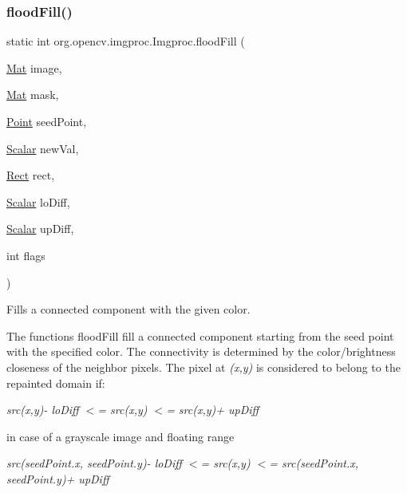 \subsubsection{\texorpdfstring{flood\+Fill()}{floodFill()}\hspace{0.1cm}{\footnotesize\ttfamily [1/2]}}
{\footnotesize\ttfamily static int org.\+opencv.\+imgproc.\+Imgproc.\+flood\+Fill (\begin{DoxyParamCaption}\item[{\mbox{\hyperlink{classorg_1_1opencv_1_1core_1_1_mat}{Mat}}}]{image,  }\item[{\mbox{\hyperlink{classorg_1_1opencv_1_1core_1_1_mat}{Mat}}}]{mask,  }\item[{\mbox{\hyperlink{classorg_1_1opencv_1_1core_1_1_point}{Point}}}]{seed\+Point,  }\item[{\mbox{\hyperlink{classorg_1_1opencv_1_1core_1_1_scalar}{Scalar}}}]{new\+Val,  }\item[{\mbox{\hyperlink{classorg_1_1opencv_1_1core_1_1_rect}{Rect}}}]{rect,  }\item[{\mbox{\hyperlink{classorg_1_1opencv_1_1core_1_1_scalar}{Scalar}}}]{lo\+Diff,  }\item[{\mbox{\hyperlink{classorg_1_1opencv_1_1core_1_1_scalar}{Scalar}}}]{up\+Diff,  }\item[{int}]{flags }\end{DoxyParamCaption})\hspace{0.3cm}{\ttfamily [static]}}

Fills a connected component with the given color.

The functions {\ttfamily flood\+Fill} fill a connected component starting from the seed point with the specified color. The connectivity is determined by the color/brightness closeness of the neighbor pixels. The pixel at {\itshape (x,y)} is considered to belong to the repainted domain if\+:


\begin{DoxyItemize}
\item {\itshape src(x\textquotesingle{},y\textquotesingle{})-\/ lo\+Diff $<$= src(x,y) $<$= src(x\textquotesingle{},y\textquotesingle{})+ up\+Diff} 
\end{DoxyItemize}

in case of a grayscale image and floating range


\begin{DoxyItemize}
\item {\itshape src(seed\+Point.\+x, seed\+Point.\+y)-\/ lo\+Diff $<$= src(x,y) $<$= src(seed\+Point.\+x, seed\+Point.\+y)+ up\+Diff} 
\end{DoxyItemize}

